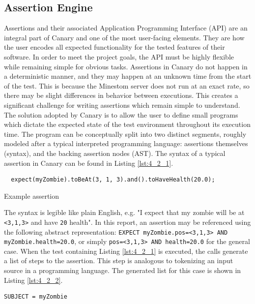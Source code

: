 \documentclass[12pt]{article}
\def\code#1{\texttt{#1}}
\begin{document}
\begin{onehalfspacing}
\subsection{Assertion Engine}\label{assertions}

Assertions and their associated Application Programming Interface (API)
are an integral part of Canary and one of the most user-facing elements.
They are how the user encodes all expected functionality for the tested
features of their software. In order to meet the project goals, the API
must be highly flexible while remaining simple for obvious tasks.
Assertions in Canary do not happen in a deterministic manner, and they
may happen at an unknown time from the start of the test. This is
because the Minestom server does not run at an exact rate, so there may
be slight differences in behavior between executions. This creates a
significant challenge for writing assertions which remain simple to
understand. The solution adopted by Canary is to allow the user to
define small programs which dictate the expected state of the test
environment throughout its execution time. The program can be
conceptually split into two distinct segments, roughly modeled after a
typical interpreted programming language: assertions themselves
(syntax), and the backing assertion nodes (AST). The syntax of a typical
assertion in Canary can be found in Listing \ref{lst:4_2_1}.

\begin{listing}[H]
\begin{verbatim}
  expect(myZombie).toBeAt(3, 1, 3).and().toHaveHealth(20.0);
\end{verbatim}
\caption{Example assertion}
\label{lst:4_2_1}
\end{listing}
The syntax is legible like plain English, e.g. "I expect that my zombie
will be at \code{\textless3,1,3\textgreater{}} and have \code{20} health". In this
report, an assertion may be referenced using the following abstract
representation: \code{EXPECT myZombie.pos=\textless3,1,3\textgreater{} AND
myZombie.health=20.0}, or simply \code{pos=\textless3,1,3\textgreater{} AND
health=20.0} for the general case. When the test containing Listing \ref{lst:4_2_1}
is executed, the calls generate a list of steps to the assertion. This
step is analogous to tokenizing an input source in a programming
language. The generated list for this case is shown in Listing \ref{lst:4_2_2}.

\begin{listing}[H]
\begin{verbatim}
SUBJECT = myZombie


\end{verbatim}
\end{listing}
\end{onehalfspacing}
\end{document}
